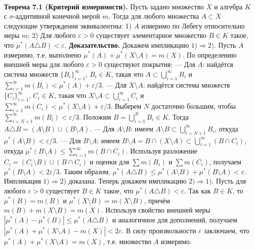 \documentclass[12pt]{article}
\begin{document}
\\\textbf{Теорема 7.1 (Критерий измеримости).} Пусть задано множество $X$ и алгебра $K$ с $\sigma$-аддитивной конечной мерой $m$. Тогда для любого множества $A \subset X$ следующие утверждения эквивалентны: 1) $A$ измеримо по Лебегу относительно меры $m$; 2) Для любого $\varepsilon > 0$ существует элементарное множество $B \in K$ такое, что $\mu^{*}(A \triangle B) < \varepsilon$. \textbf{Доказательство.} Докажем импликацию $1) \Rightarrow 2)$. Пусть $A$ измеримо, т.е. выполнено $\mu^{*}(A) + \mu^{*}(X \setminus A) = m(X)$. По определению внешней меры для любого $\varepsilon > 0$ существуют покрытия: — Для $A$: найдётся система множеств $\{B_i\}_{i=1}^\infty$, $B_i \in K$, такая что $A \subset \bigcup_{i=1}^\infty B_i$ и $\sum_{i=1}^\infty m(B_i) < \mu^{*}(A) + \varepsilon/3$. — Для $X \setminus A$: найдётся система множеств $\{C_i\}_{i=1}^\infty$, $C_i \in K$, такая что $X \setminus A \subset \bigcup_{i=1}^\infty C_i$ и $\sum_{i=1}^\infty m(C_i) < \mu^{*}(X \setminus A) + \varepsilon/3$. Выберем $N$ достаточно большим, чтобы $\sum_{i=N+1}^\infty m(B_i) < \varepsilon/3$. Положим $B = \bigcup_{i=1}^N B_i \in K$. Тогда $A \triangle B = (A \setminus B) \cup (B \setminus A)$. — Для $A \setminus B$: имеем $A \setminus B \subset \bigcup_{i=N+1}^\infty B_i$, откуда $\mu^{*}(A \setminus B) < \varepsilon/3$. — Для $B \setminus A$: имеем $B \setminus A = B \cap (X \setminus A) \subset \bigcup_{i=1}^\infty (B \cap C_i)$, откуда $\mu^{*}(B \setminus A) \leq \sum_{i=1}^\infty m(B \cap C_i)$. Используя разложение $C_i = (C_i \setminus B) \cup (B \cap C_i)$ и оценки для $\sum m(B_i)$ и $\sum m(C_i)$, получаем $\mu^{*}(B \setminus A) < 2\varepsilon/3$. Таким образом, $\mu^{*}(A \triangle B) \leq \mu^{*}(A \setminus B) + \mu^{*}(B \setminus A) < \varepsilon$. Импликация $1) \Rightarrow 2)$ доказана. Теперь докажем импликацию $2) \Rightarrow 1)$. Пусть для любого $\varepsilon > 0$ существует $B \in K$ такое, что $\mu^{*}(A \triangle B) < \varepsilon$. Так как $B \in K$, то $\mu^{*}(B) = m(B)$ и $\mu^{*}(X \setminus B) = m(X \setminus B)$, причём $m(B) + m(X \setminus B) = m(X)$. Используя свойство внешней меры $|\mu^{*}(A) - \mu^{*}(B)| \leq \mu^{*}(A \triangle B)$ и аналогичное для дополнений, получаем $|\mu^{*}(A) + \mu^{*}(X \setminus A) - m(X)| < 2\varepsilon$. В силу произвольности $\varepsilon$ заключаем, что $\mu^{*}(A) + \mu^{*}(X \setminus A) = m(X)$, т.е. множество $A$ измеримо.

\end{document}
